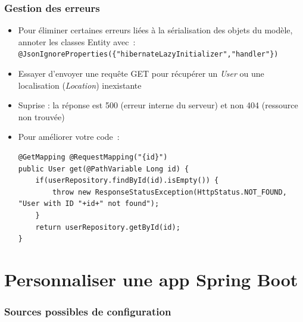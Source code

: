 \documentclass{beamer}
\begin{document}
\begin{frame}[fragile]
	\frametitle{Gestion des erreurs}
	\begin{itemize}
		\item Pour éliminer certaines erreurs liées à la sérialisation des objets du modèle, annoter les classes Entity avec~:\\ \footnotesize
		\texttt{@JsonIgnoreProperties(\{"hibernateLazyInitializer","handler"\})}\\
		\normalsize
		\item Essayer d'envoyer une requête GET pour récupérer un \textit{User} ou une localisation (\textit{Location}) inexistante
		\item Suprise : la réponse est 500 (erreur interne du serveur) et non 404 (ressource non trouvée)
		\item Pour améliorer votre code~:
\begin{lstlisting}
@GetMapping @RequestMapping("{id}")
public User get(@PathVariable Long id) {
	if(userRepository.findById(id).isEmpty()) {
		throw new ResponseStatusException(HttpStatus.NOT_FOUND, "User with ID "+id+" not found");
	}
	return userRepository.getById(id);
}
\end{lstlisting}
	\end{itemize}
\end{frame} 

\section{Personnaliser une app Spring Boot}

\begin{frame}[fragile]
	\frametitle{Sources possibles de configuration}
\end{frame} 
\end{document}
